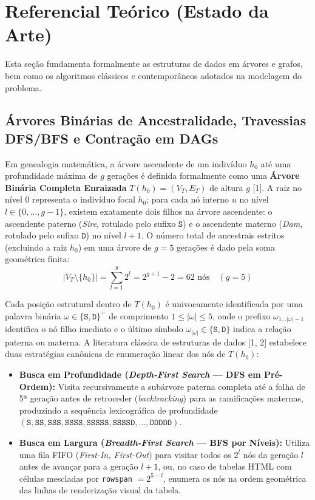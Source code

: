 \documentclass[conference]{IEEEtran}
\begin{document}
\section{Referencial Teórico (Estado da Arte)}
Esta seção fundamenta formalmente as estruturas de dados em árvores e grafos, bem como os algoritmos clássicos e contemporâneos adotados na modelagem do problema.

\subsection{Árvores Binárias de Ancestralidade, Travessias DFS/BFS e Contração em DAGs}
Em genealogia matemática, a árvore ascendente de um indivíduo $h_0$ até uma profundidade máxima de $g$ gerações é definida formalmente como uma \textbf{Árvore Binária Completa Enraizada} $T(h_0) = (V_T, E_T)$ de altura $g$ [1]. A raiz no nível $0$ representa o indivíduo focal $h_0$; para cada nó interno $u$ no nível $l \in \{0, \dots, g-1\}$, existem exatamente dois filhos na árvore ascendente: o ascendente paterno (\textit{Sire}, rotulado pelo sufixo $\texttt{S}$) e o ascendente materno (\textit{Dam}, rotulado pelo sufixo $\texttt{D}$) no nível $l + 1$. O número total de ancestrais estritos (excluindo a raiz $h_0$) em uma árvore de $g = 5$ gerações é dado pela soma geométrica finita:
\begin{equation}
    |V_T \setminus \{h_0\}| = \sum_{l=1}^{g} 2^l = 2^{g+1} - 2 = 62 \text{ nós} \quad (g = 5)
\end{equation}

Cada posição estrutural dentro de $T(h_0)$ é univocamente identificada por uma palavra binária $\omega \in \{\texttt{S}, \texttt{D}\}^+$ de comprimento $1 \le |\omega| \le 5$, onde o prefixo $\omega_{1 \dots |\omega|-1}$ identifica o nó filho imediato e o último símbolo $\omega_{|\omega|} \in \{\texttt{S}, \texttt{D}\}$ indica a relação paterna ou materna. A literatura clássica de estruturas de dados [1, 2] estabelece duas estratégias canônicas de enumeração linear dos nós de $T(h_0)$:
\begin{itemize}
    \item \textbf{Busca em Profundidade (\textit{Depth-First Search} --- DFS em Pré-Ordem):} Visita recursivamente a subárvore paterna completa até a folha de 5ª geração antes de retroceder (\textit{backtracking}) para as ramificações maternas, produzindo a sequência lexicográfica de profundidade $(\texttt{S}, \texttt{SS}, \texttt{SSS}, \texttt{SSSS}, \texttt{SSSSS}, \texttt{SSSSD}, \dots, \texttt{DDDDD})$.
    \item \textbf{Busca em Largura (\textit{Breadth-First Search} --- BFS por Níveis):} Utiliza uma fila FIFO (\textit{First-In, First-Out}) para visitar todos os $2^l$ nós da geração $l$ antes de avançar para a geração $l+1$, ou, no caso de tabelas HTML com células mescladas por \texttt{rowspan} $= 2^{5-l}$, enumera os nós na ordem geométrica das linhas de renderização visual da tabela.
\end{itemize}
\end{document}
